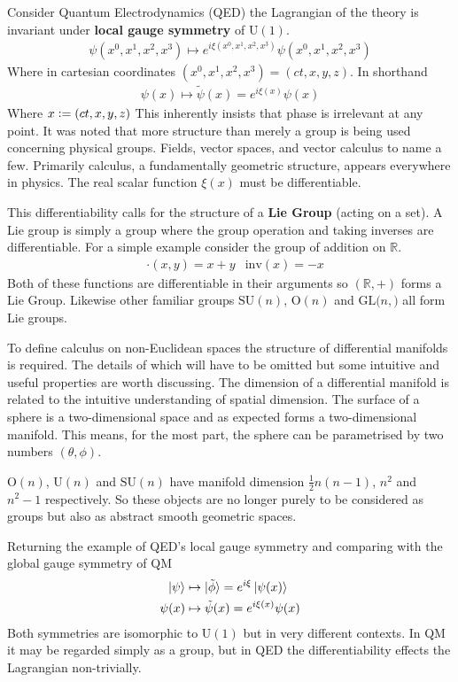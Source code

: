 Consider Quantum Electrodynamics (QED) the Lagrangian of the theory is invariant under \textbf{local gauge symmetry} of $\mathrm{U}(1)$.
\begin{align*}
\psi(x^0,x^1,x^2,x^3) \mapsto e^{i \xi(x^0,x^1,x^2,x^3)} \psi(x^0,x^1,x^2,x^3)
\end{align*}
Where in cartesian coordinates $(x^0,x^1,x^2,x^3)=(ct,x,y,z)$. In shorthand
\begin{align*}
\psi(x) \mapsto  \tilde{\psi}(x)=e^{i \xi(x)} \psi(x)
\end{align*}
Where $x\vcentcolon=(ct,x,y,z)$ This inherently insists that phase is irrelevant at any point. It was noted that more structure than merely a group is being used  concerning physical groups. Fields, vector spaces, and vector calculus to name a few. Primarily calculus, a fundamentally geometric structure, appears everywhere in physics. The real scalar function $\xi(x)$ must be differentiable.

This differentiability calls for the structure of a \textbf{Lie Group} (acting on a set). A Lie group is simply a group where the group operation and taking inverses are differentiable. For a simple example consider the group of addition on $\mathbb{R}$.
\begin{align*}
&\cdot(x,y) = x+y &\mathrm{inv}(x) = -x
\end{align*}
Both of these functions are differentiable in their arguments so $(\mathbb{R},+)$ forms a Lie Group. Likewise other familiar groups $\mathrm{SU}(n)$, $\mathrm{O}(n)$ and $\mathrm{GL}(n,\mathrm)$ all form Lie groups.

To define calculus on non-Euclidean spaces the structure of differential manifolds is required. The details of which will have to be omitted but some intuitive and useful properties are worth discussing. The dimension of a differential manifold is related to the intuitive understanding of spatial dimension. The surface of a sphere is a two-dimensional space and as expected forms a two-dimensional manifold. This means, for the most part, the sphere can be parametrised by two numbers $(\theta,\phi)$.

$\mathrm{O}(n)$, $\mathrm{U}(n)$ and $\mathrm{SU}(n)$ have manifold dimension $\frac{1}{2}n(n-1)$, $n^2$ and $n^2-1$ respectively. So these objects are no longer purely to be considered as groups but also as abstract smooth geometric spaces.

Returning the example of QED's local gauge symmetry and comparing with the global gauge symmetry of QM
\begin{align*}
\ket{\psi} &\mapsto  \ket{\tilde{\phi}}=e^{i \xi} \ket{\psi(x)} \\
\psi(x) &\mapsto  \tilde{\psi}(x)=e^{i \xi(x)} \psi(x)
\end{align*}
Both symmetries are isomorphic to $\mathrm{U}(1)$ but in very different contexts. In QM it may be regarded simply as a group, but in QED the differentiability effects the Lagrangian non-trivially.


